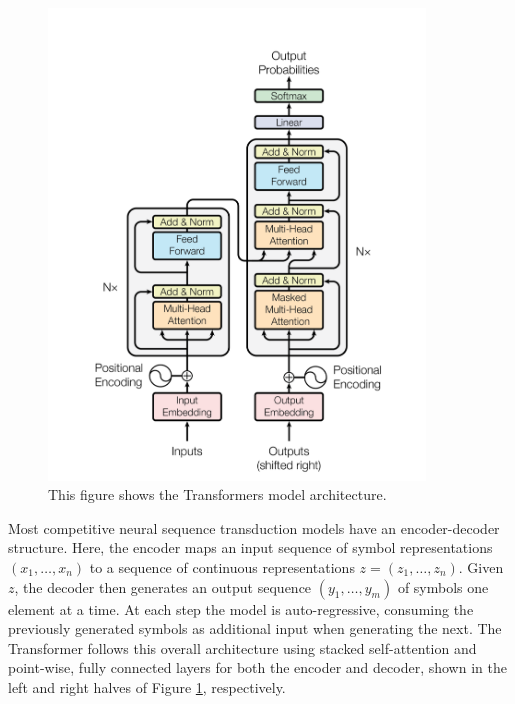 \begin{figure}[H]
	\centering
	\includegraphics[width=10cm, keepaspectratio]{chapters/1_introduction/imgs/transformers.png}
	\caption{This figure shows the Transformers\cite{attention} model architecture.}
	\label{fig:transarch}
\end{figure}

Most competitive neural sequence transduction models have an encoder-decoder structure\cite{trans2}.
Here, the encoder maps an input sequence of symbol representations $(x_1, \ldots, x_n)$ to a sequence
of continuous representations $z = (z_1, \ldots, z_n)$. Given $z$, the decoder then generates an output
sequence $(y_1, \ldots, y_m)$ of symbols one element at a time. At each step the model is auto-regressive, consuming the previously generated symbols as additional input when generating the next.
The Transformer follows this overall architecture using stacked self-attention and point-wise, fully
connected layers for both the encoder and decoder, shown in the left and right halves of Figure \ref{fig:transarch}, respectively.

